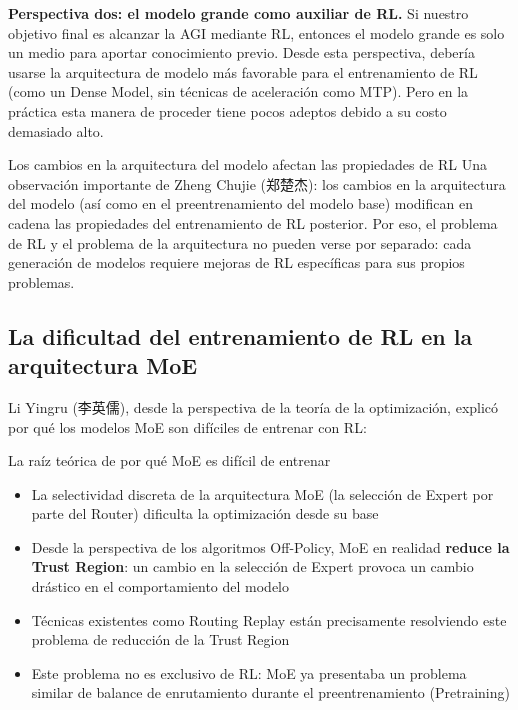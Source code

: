 \documentclass[a4paper]{article}
\begin{document}
\textbf{Perspectiva dos: el modelo grande como auxiliar de RL.} Si nuestro objetivo final es alcanzar la AGI mediante RL, entonces el modelo grande es solo un medio para aportar conocimiento previo. Desde esta perspectiva, debería usarse la arquitectura de modelo más favorable para el entrenamiento de RL (como un Dense Model, sin técnicas de aceleración como MTP). Pero en la práctica esta manera de proceder tiene pocos adeptos debido a su costo demasiado alto.

\begin{knowledgebox}{Los cambios en la arquitectura del modelo afectan las propiedades de RL}
Una observación importante de Zheng Chujie (郑楚杰): los cambios en la arquitectura del modelo (así como en el preentrenamiento del modelo base) modifican en cadena las propiedades del entrenamiento de RL posterior. Por eso, el problema de RL y el problema de la arquitectura no pueden verse por separado: cada generación de modelos requiere mejoras de RL específicas para sus propios problemas.
\end{knowledgebox}

\subsection{La dificultad del entrenamiento de RL en la arquitectura MoE}

Li Yingru (李英儒), desde la perspectiva de la teoría de la optimización, explicó por qué los modelos MoE son difíciles de entrenar con RL:

\begin{warningbox}{La raíz teórica de por qué MoE es difícil de entrenar}
\begin{itemize}
    \item La selectividad discreta de la arquitectura MoE (la selección de Expert por parte del Router) dificulta la optimización desde su base
    \item Desde la perspectiva de los algoritmos Off-Policy, MoE en realidad \textbf{reduce la Trust Region}: un cambio en la selección de Expert provoca un cambio drástico en el comportamiento del modelo
    \item Técnicas existentes como Routing Replay están precisamente resolviendo este problema de reducción de la Trust Region
    \item Este problema no es exclusivo de RL: MoE ya presentaba un problema similar de balance de enrutamiento durante el preentrenamiento (Pretraining)
\end{itemize}
\end{warningbox}
\end{document}
